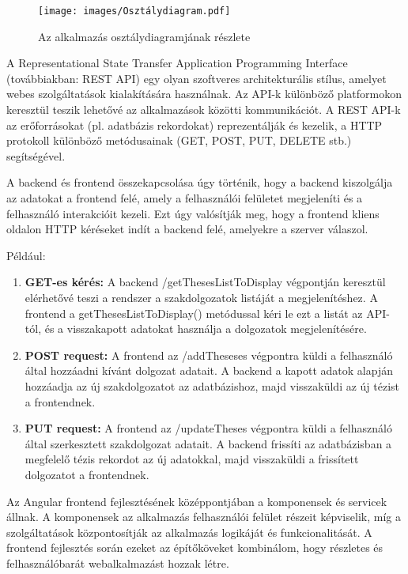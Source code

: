 \begin{figure}[ht]
	\texttt{[image: images/Osztálydiagram.pdf]}
	\caption{Az alkalmazás osztálydiagramjának részlete}
	\label{fig:Osztálydiagram}
\end{figure}




A Representational State Transfer Application Programming Interface (továbbiakban: REST API) egy olyan szoftveres architekturális stílus, amelyet webes szolgáltatások kialakítására használnak. Az API-k különböző platformokon keresztül teszik lehetővé az alkalmazások közötti kommunikációt. A REST API-k az erőforrásokat (pl. adatbázis rekordokat) reprezentálják és kezelik, a HTTP protokoll különböző metódusainak (GET, POST, PUT, DELETE stb.) segítségével.

A backend és frontend összekapcsolása úgy történik, hogy a backend kiszolgálja az adatokat a frontend felé, amely a felhasználói felületet megjeleníti és a felhasználó interakcióit kezeli. Ezt úgy valósítják meg, hogy a frontend kliens oldalon HTTP kéréseket indít a backend felé, amelyekre a szerver válaszol.

Például:

\begin{enumerate}

\item{\textbf{GET-es kérés:}}
A backend /getThesesListToDisplay végpontján keresztül elérhetővé teszi a rendszer a szakdolgozatok listáját a megjelenítéshez.
A frontend a getThesesListToDisplay() metódussal kéri le ezt a listát az API-tól, és a visszakapott adatokat használja a dolgozatok megjelenítésére.
\item{\textbf{POST request:}}
A frontend az /addTheseses végpontra küldi a felhasználó által hozzáadni kívánt dolgozat adatait.
A backend a kapott adatok alapján hozzáadja az új szakdolgozatot az adatbázishoz, majd visszaküldi az új tézist a frontendnek.
\item{\textbf{PUT request:}}
A frontend az /updateTheses végpontra küldi a felhasználó által szerkesztett szakdolgozat adatait.
A backend frissíti az adatbázisban a megfelelő tézis rekordot az új adatokkal, majd visszaküldi a frissített dolgozatot a frontendnek.


\end{enumerate}



Az Angular frontend fejlesztésének középpontjában a komponensek és servicek állnak. A komponensek az alkalmazás felhasználói felület részeit képviselik, míg a szolgáltatások központosítják az alkalmazás logikáját és funkcionalitását. A frontend fejlesztés során ezeket az építőköveket kombinálom, hogy részletes és felhasználóbarát webalkalmazást hozzak létre.

